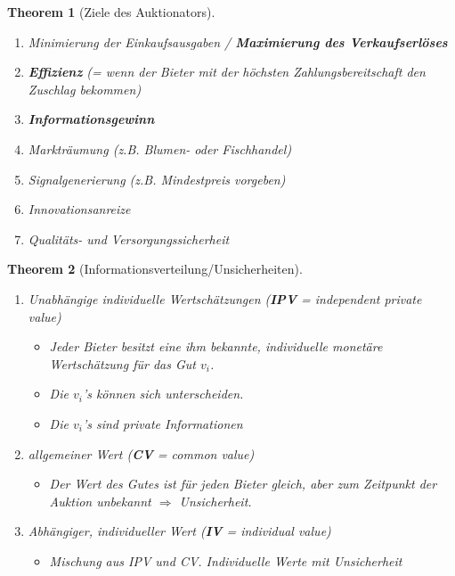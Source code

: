 \documentclass[12pt]{extreport} %
\theoremstyle{named}
\newtheorem*{unnamedtheorem*}{Theorem}
\theoremstyle{itshape}
\theoremstyle{normal}
\begin{document}
 
\begin{unnamedtheorem*}[Ziele des Auktionators] ~\
	\begin{enumerate}
		\item Minimierung der Einkaufsausgaben / \textbf{Maximierung des Verkaufserlöses}
		\item \textbf{Effizienz} (= wenn der Bieter mit der höchsten Zahlungsbereitschaft den Zuschlag bekommen)
		\item \textbf{Informationsgewinn}
		\item Markträumung (z.B. Blumen- oder Fischhandel)
		\item Signalgenerierung (z.B. Mindestpreis vorgeben)
		\item Innovationsanreize
		\item Qualitäts- und Versorgungssicherheit
	\end{enumerate}	
\end{unnamedtheorem*}

  
\begin{unnamedtheorem*}[Informationsverteilung/Unsicherheiten] ~\
	\begin{enumerate}
		\item Unabhängige individuelle Wertschätzungen (\textbf{IPV} = independent private value)
			\begin{itemize}
				\item Jeder Bieter besitzt eine ihm bekannte, individuelle monetäre Wertschätzung für das Gut $v_{i}$.
				\item Die $v_{i}$'s können sich unterscheiden.
				\item Die $v_{i}$'s sind private Informationen
			\end{itemize}
		\item allgemeiner Wert (\textbf{CV} = common value)
			\begin{itemize}
				\item Der Wert des Gutes ist für jeden Bieter gleich, aber zum Zeitpunkt der Auktion unbekannt $\Rightarrow$ Unsicherheit.
			\end{itemize}
		\item Abhängiger, individueller Wert (\textbf{IV} = individual value)
			\begin{itemize}
				\item Mischung aus IPV und CV. Individuelle Werte mit Unsicherheit
			\end{itemize}
	\end{enumerate}	
\end{unnamedtheorem*}
\end{document}

